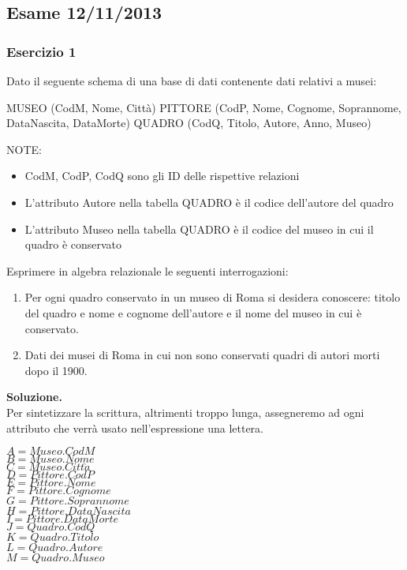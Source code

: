 \newpage
\subsection{Esame 12/11/2013}
  \subsubsection{Esercizio 1}
  Dato il seguente schema di una base di dati contenente dati relativi a musei:
  \begin{center}
    MUSEO (CodM, Nome, Città)
    PITTORE (CodP, Nome, Cognome, Soprannome, DataNascita, DataMorte)
    QUADRO (CodQ, Titolo, Autore, Anno, Museo)
  \end{center}
  NOTE: 
  \begin{itemize}
   \item CodM, CodP, CodQ sono gli ID delle rispettive relazioni
   \item L'attributo Autore nella tabella QUADRO è il codice dell'autore del quadro
   \item L'attributo Museo nella tabella QUADRO è il codice del museo in cui il quadro è conservato
  \end{itemize}
 Esprimere in algebra relazionale le seguenti interrogazioni:
 \begin{enumerate}
  \item Per ogni quadro conservato in un museo di Roma si desidera conoscere: titolo del quadro 
  e nome e cognome dell’autore e il nome del museo in cui è conservato.
  \item Dati dei musei di Roma in cui non sono conservati quadri di autori morti dopo il 1900.
 \end{enumerate}

  \noindent\textbf{\fontsize{14pt}{1em}Soluzione.}\\
  Per sintetizzare la scrittura, altrimenti troppo lunga, assegneremo ad ogni attributo che verrà usato
  nell'espressione una lettera.
  
  \begin{multicols}{3}
  \begin{flushleft}
   $A = Museo.CodM$\\
   $B = Museo.Nome$\\
   $C = Museo.Citt\grave{a}$\\
   $D = Pittore.CodP$\\
   $E = Pittore.Nome$\\
   $F = Pittore.Cognome$\\
   $G = Pittore.Soprannome$\\
   $H = Pittore.DataNascita$\\
   $I = Pittore.DataMorte$\\
   $J = Quadro.CodQ$\\
   $K = Quadro.Titolo$\\
   $L = Quadro.Autore$\\
   $M = Quadro.Museo$\\
  \end{flushleft}
  \end{multicols}

